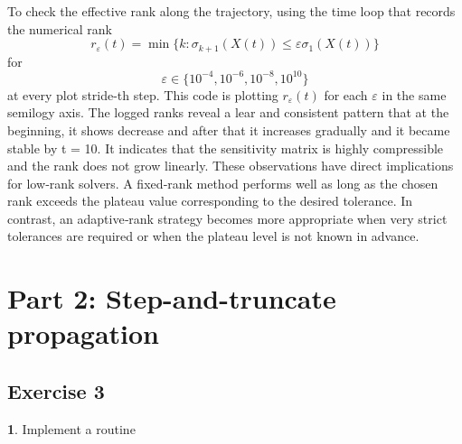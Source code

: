 \documentclass[11pt]{article}
\begin{document}
To check the effective rank along the trajectory, using the time loop that records the numerical rank
\[
r_\varepsilon(t) = \min \{ k : \sigma_{k+1}(X(t)) \leq \varepsilon \sigma_1(X(t)) \}
\]
for 
\[
\varepsilon \in \{10^{-4},10^{-6},10^{-8},10^{10}\}
\]
at every plot stride-th step. This code is plotting $r_\varepsilon(t)$ for each $\varepsilon$ in the same semilogy axis. The logged ranks reveal a lear and consistent pattern that at the beginning, it shows decrease and after that it increases gradually and it became stable by t = 10. It indicates that the sensitivity matrix is highly compressible and the rank does not grow linearly. These observations have direct implications for low‑rank solvers. A fixed‑rank method performs well as long as the chosen rank exceeds the plateau value corresponding to the desired tolerance. In contrast, an adaptive‑rank strategy becomes more appropriate when very strict tolerances are required or when the plateau level is not known in advance.

\section*{Part 2:  Step-and-truncate propagation}
\subsection*{Exercise 3}
\textbf{1}. Implement a routine 
\end{document}
